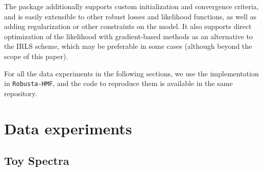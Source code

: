 \documentclass[onecolumn,floatfix]{aastex631}
\begin{document}
The package additionally supports custom initialization and convergence criteria, and is easily extensible to other robust losses and likelihood functions, as well as adding regularization or other constraints on the model.
It also supports direct optimization of the likelihood with gradient-based methods as an alternative to the IRLS scheme, which may be preferable in some cases (although beyond the scope of this paper).

For all the data experiments in the following sections, we use the implementation in \texttt{Robusta-HMF}, and the code to reproduce them is available in the same repository.

\section{Data experiments}

\subsection{Toy Spectra} \label{sec:toy}
\end{document}
